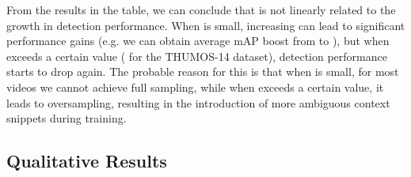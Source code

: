 \documentclass[journal,comsoc]{IEEEtran}
\begin{document}
\par From the results in the table, we can conclude that  is not linearly related to the growth in detection performance. When  is small, increasing  can lead to significant performance gains (e.g. we can obtain  average mAP boost from  to ), but when  exceeds a certain value ( for the THUMOS-14 dataset), detection performance starts to drop again. The probable reason for this is that when  is small, for most videos we cannot achieve full sampling, while when  exceeds a certain value, it leads to oversampling, resulting in the introduction of more ambiguous context snippets during training.

\begin{table}[t]
	\centering
	\caption{Evaluation the influence of video snippets sample number  on the THUMOS-14 dataset.}
	\label{table:sample_T_ablation_thu14}
\end{table}

\subsection{Qualitative Results}
\end{document}
